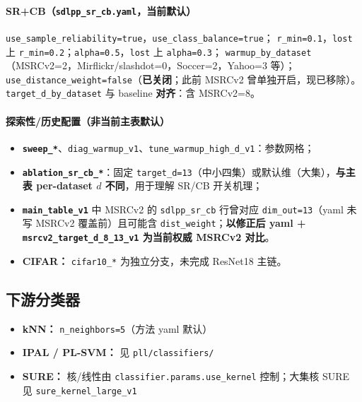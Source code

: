 \documentclass[11pt,a4paper]{article}
\begin{document}
\paragraph{SR+CB（\texttt{sdlpp\_sr\_cb.yaml}，当前默认）}
\texttt{use\_sample\_reliability=true}，\texttt{use\_class\_balance=true}；
\texttt{r\_min=0.1}，\texttt{lost} 上 \texttt{r\_min=0.2}；\texttt{alpha=0.5}，\texttt{lost} 上 \texttt{alpha=0.3}；
\texttt{warmup\_by\_dataset}（MSRCv2=2，Mirflickr/slashdot=0，Soccer=2，Yahoo=3 等）；
\texttt{use\_distance\_weight=false}（\textbf{已关闭}；此前 MSRCv2 曾单独开启，现已移除）。
\texttt{target\_d\_by\_dataset} 与 baseline \textbf{对齐}：含 MSRCv2=8。

\paragraph{探索性/历史配置（非当前主表默认）}
\begin{itemize}
  \item \textbf{\texttt{sweep\_*}}、\texttt{diag\_warmup\_v1}、\texttt{tune\_warmup\_high\_d\_v1}：参数网格；
  \item \textbf{\texttt{ablation\_sr\_cb\_*}}：固定 \texttt{target\_d=13}（中小四集）或默认维（大集），\textbf{与主表 per-dataset $d$ 不同}，用于理解 SR/CB 开关机理；
  \item \textbf{\texttt{main\_table\_v1}} 中 MSRCv2 的 \texttt{sdlpp\_sr\_cb} 行曾对应 \texttt{dim\_out=13}（yaml 未写 MSRCv2 覆盖前）且可能含 \texttt{dist\_weight}；\textbf{以修正后 yaml + \texttt{msrcv2\_target\_d\_8\_13\_v1} 为当前权威 MSRCv2 对比}。
  \item \textbf{CIFAR：} \texttt{cifar10\_*} 为独立分支，未完成 ResNet18 主链。
\end{itemize}

\subsection{下游分类器}
\begin{itemize}
  \item \textbf{kNN：} \texttt{n\_neighbors=5}（方法 yaml 默认）
  \item \textbf{IPAL / PL-SVM：} 见 \texttt{pll/classifiers/}
  \item \textbf{SURE：} 核/线性由 \texttt{classifier.params.use\_kernel} 控制；大集核 SURE 见 \texttt{sure\_kernel\_large\_v1}
\end{itemize}

\end{document}
